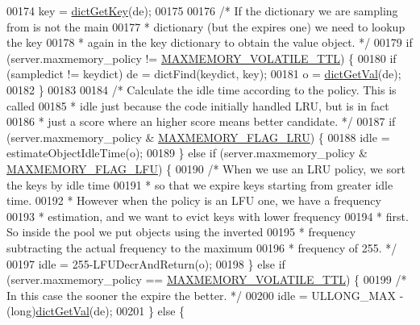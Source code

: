 \begin{DoxyCode}
00174         key = \hyperlink{dict_8h_a3271c334309904a3086deca94f96e46e}{dictGetKey}(de);
00175 
00176         \textcolor{comment}{/* If the dictionary we are sampling from is not the main}
00177 \textcolor{comment}{         * dictionary (but the expires one) we need to lookup the key}
00178 \textcolor{comment}{         * again in the key dictionary to obtain the value object. */}
00179         \textcolor{keywordflow}{if} (server.maxmemory\_policy != \hyperlink{server_8h_a463db85c87bf7ecf91e3f9d182397969}{MAXMEMORY\_VOLATILE\_TTL}) \{
00180             \textcolor{keywordflow}{if} (sampledict != keydict) de = dictFind(keydict, key);
00181             o = \hyperlink{dict_8h_ae8d2cc391873b2bea2b87c4f80f43120}{dictGetVal}(de);
00182         \}
00183 
00184         \textcolor{comment}{/* Calculate the idle time according to the policy. This is called}
00185 \textcolor{comment}{         * idle just because the code initially handled LRU, but is in fact}
00186 \textcolor{comment}{         * just a score where an higher score means better candidate. */}
00187         \textcolor{keywordflow}{if} (server.maxmemory\_policy & \hyperlink{server_8h_a9f9503e7c7ba52df66b097c2b0b4c6d0}{MAXMEMORY\_FLAG\_LRU}) \{
00188             idle = estimateObjectIdleTime(o);
00189         \} \textcolor{keywordflow}{else} \textcolor{keywordflow}{if} (server.maxmemory\_policy & \hyperlink{server_8h_aac2d3ad7a604f87e06e25233dbd01c9b}{MAXMEMORY\_FLAG\_LFU}) \{
00190             \textcolor{comment}{/* When we use an LRU policy, we sort the keys by idle time}
00191 \textcolor{comment}{             * so that we expire keys starting from greater idle time.}
00192 \textcolor{comment}{             * However when the policy is an LFU one, we have a frequency}
00193 \textcolor{comment}{             * estimation, and we want to evict keys with lower frequency}
00194 \textcolor{comment}{             * first. So inside the pool we put objects using the inverted}
00195 \textcolor{comment}{             * frequency subtracting the actual frequency to the maximum}
00196 \textcolor{comment}{             * frequency of 255. */}
00197             idle = 255-LFUDecrAndReturn(o);
00198         \} \textcolor{keywordflow}{else} \textcolor{keywordflow}{if} (server.maxmemory\_policy == \hyperlink{server_8h_a463db85c87bf7ecf91e3f9d182397969}{MAXMEMORY\_VOLATILE\_TTL}) \{
00199             \textcolor{comment}{/* In this case the sooner the expire the better. */}
00200             idle = ULLONG\_MAX - (\textcolor{keywordtype}{long})\hyperlink{dict_8h_ae8d2cc391873b2bea2b87c4f80f43120}{dictGetVal}(de);
00201         \} \textcolor{keywordflow}{else} \{

\end{DoxyCode}
